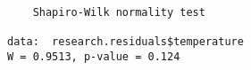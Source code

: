 \begin{verbatim} 

	Shapiro-Wilk normality test

data:  research.residuals$temperature
W = 0.9513, p-value = 0.124

\end{verbatim}